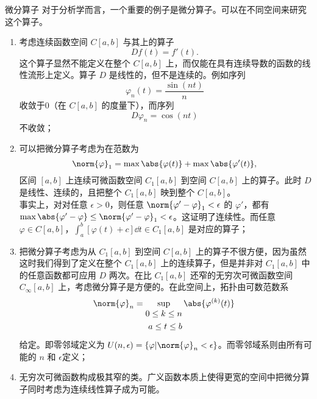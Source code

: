 \begin{example}{微分算子}
对于分析学而言，一个重要的例子是微分算子。可以在不同空间来研究这个算子。

\begin{enumerate}
\item 考虑连续函数空间 $C[a,b]$ 与其上的算子 
\begin{equation}
Df(t)=f'(t).~
\end{equation}
这个算子显然不能定义在整个 $C[a,b]$ 上，而仅能在具有连续导数的函数的线性流形上定义。算子 $D$ 是线性的，但不是连续的。例如序列
\begin{equation}
\varphi_n(t)=\frac{\sin(nt)}{n}~
\end{equation}
收敛于0（在 $C[a,b]$ 的度量下），而序列
\begin{equation}
D\varphi_n=\cos(nt)~
\end{equation}
不收敛；
\item 可以把微分算子考虑为在范数为
\begin{equation}
\norm{\varphi}_1=\max\abs{\varphi(t)}+\max\abs{\varphi'(t)},~
\end{equation}
区间 $[a,b]$ 上连续可微函数空间 $C_1[a,b]$ 到空间 $C[a,b]$ 上的算子。此时 $D$ 是线性、连续的，且把整个 $C_1[a,b]$ 映到整个 $C[a,b]$。\\
事实上，对对任意 $\epsilon>0$，则任意 $\norm{\varphi'-\varphi}_1<\epsilon$ 的 $\varphi'$，都有 $\max\abs{\varphi'-\varphi}\leq \norm{\varphi'-\varphi}_1<\epsilon$。这证明了连续性。而任意 $\varphi\in C[a,b]$，$\int_a^b[\varphi(t)+c]\dd t\in C_1[a,b]$ 是对应的算子；

\item 把微分算子考虑为从 $C_1[a,b]$ 到空间 $C[a,b]$ 上的算子不很方便，因为虽然这时我们得到了定义在整个 $C_1[a,b]$ 上的连续算子，但是并非对 $C_1[a,b]$ 中的任意函数都可应用 $D$ 两次。在比 $C_1[a,b]$ 还窄的无穷次可微函数空间 $C_\infty[a,b]$ 上，考虑微分算子是方便的。在此空间上，拓扑由可数范数系
\begin{equation}
\norm{\varphi}_n=\sup_{\begin{aligned}
0\leq k\leq n\\a\leq t\leq b
\end{aligned}}\abs{\varphi^{(k)}(t)}~
\end{equation}
给定。即零邻域定义为 $U(n,\epsilon)=\{\varphi|\norm{\varphi}_n<\epsilon\}$。而零邻域系则由所有可能的 $n$ 和 $\epsilon$定义；
\item 无穷次可微函数构成极其窄的类。广义函数本质上使得更宽的空间中把微分算子同时考虑为连续线性算子成为可能。
\end{enumerate}
\end{example}



